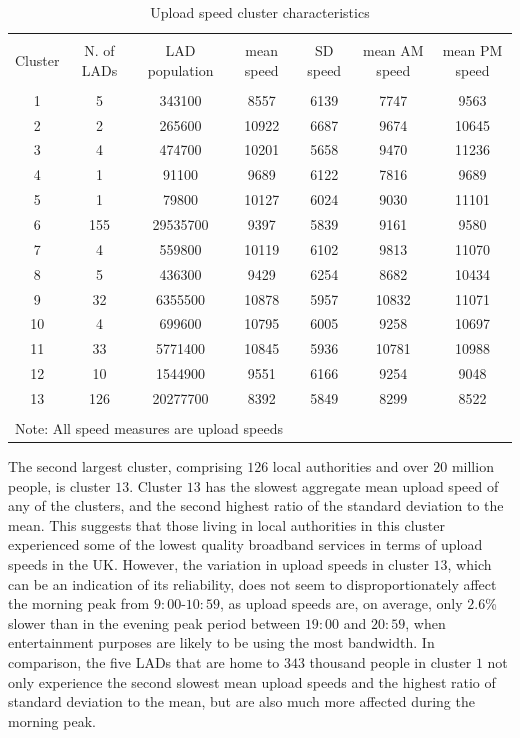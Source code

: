 \documentclass[Royal,times,sageh]{sagej}
\begin{document}
\begin{table}[!htbp] \centering 
  \caption{Upload speed cluster characteristics\label{up.cluster.descr}} 
  \label{} 
\footnotesize 
\begin{tabular}{@{\extracolsep{0pt}} ccccccc} 
\\[-1.8ex]\hline 
\hline \\[-1.8ex] 
Cluster & N. of LADs & LAD population & mean speed & SD speed & mean AM speed & mean PM speed \\ 
\hline \\[-1.8ex] 
1 & 5 & 343100 & 8557 & 6139 & 7747 & 9563 \\ 
2 & 2 & 265600 & 10922 & 6687 & 9674 & 10645 \\ 
3 & 4 & 474700 & 10201 & 5658 & 9470 & 11236 \\ 
4 & 1 & 91100 & 9689 & 6122 & 7816 & 9689 \\ 
5 & 1 & 79800 & 10127 & 6024 & 9030 & 11101 \\ 
6 & 155 & 29535700 & 9397 & 5839 & 9161 & 9580 \\ 
7 & 4 & 559800 & 10119 & 6102 & 9813 & 11070 \\ 
8 & 5 & 436300 & 9429 & 6254 & 8682 & 10434 \\ 
9 & 32 & 6355500 & 10878 & 5957 & 10832 & 11071 \\ 
10 & 4 & 699600 & 10795 & 6005 & 9258 & 10697 \\ 
11 & 33 & 5771400 & 10845 & 5936 & 10781 & 10988 \\ 
12 & 10 & 1544900 & 9551 & 6166 & 9254 & 9048 \\ 
13 & 126 & 20277700 & 8392 & 5849 & 8299 & 8522 \\ 
\hline \\[-1.8ex] 
\multicolumn{7}{l}{Note: All speed measures are upload speeds} \\ 
\end{tabular} 
\end{table}

The second largest cluster, comprising \(126\) local authorities and
over \(20\) million people, is cluster \(13\). Cluster \(13\) has the
slowest aggregate mean upload speed of any of the clusters, and the
second highest ratio of the standard deviation to the mean. This
suggests that those living in local authorities in this cluster
experienced some of the lowest quality broadband services in terms of
upload speeds in the UK. However, the variation in upload speeds in
cluster \(13\), which can be an indication of its reliability, does not
seem to disproportionately affect the morning peak from
\(9:00\)-\(10:59\), as upload speeds are, on average, only \(2.6\)\%
slower than in the evening peak period between \(19:00\) and \(20:59\),
when entertainment purposes are likely to be using the most bandwidth.
In comparison, the five LADs that are home to \(343\) thousand people in
cluster \(1\) not only experience the second slowest mean upload speeds
and the highest ratio of standard deviation to the mean, but are also
much more affected during the morning peak.
\end{document}
